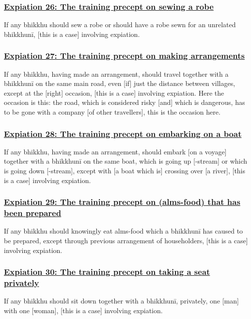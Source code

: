 \subsubsection*{\hyperref[pac26]{Expiation 26: The training precept on sewing a robe}}
\label{exp26}
If any bhikkhu should sew a robe or should have a robe sewn for an unrelated bhikkhunī, [this is a case] involving expiation.

\subsubsection*{\hyperref[pac27]{Expiation 27: The training precept on making arrangements}}
\label{exp27}
If any bhikkhu, having made an arrangement, should travel together with a bhikkhunī on the same main road, even [if] just the distance between villages, except at the [right] occasion, [this is a case] involving expiation. Here the occasion is this: the road, which is considered risky [and] which is dangerous, has to be gone with a company [of other travellers], this is the occasion here.

\subsubsection*{\hyperref[pac28]{Expiation 28: The training precept on embarking on a boat}}
\label{exp28}
If any bhikkhu, having made an arrangement, should embark [on a voyage] together with a bhikkhunī on the same boat, which is going up [-stream] or which is going down [-stream], except with [a boat which is] crossing over [a river], [this is a case] involving expiation.

\subsubsection*{\hyperref[pac29]{Expiation 29: The training precept on (alms-food) that has been prepared}}
\label{exp29}
If any bhikkhu should knowingly eat alms-food which a bhikkhunī has caused to be prepared, except through previous arrangement of householders, [this is a case] involving expiation.

\subsubsection*{\hyperref[pac30]{Expiation 30: The training precept on taking a seat privately}}
\label{exp30}
If any bhikkhu should sit down together with a bhikkhunī, privately, one [man] with one [woman], [this is a case] involving expiation.

